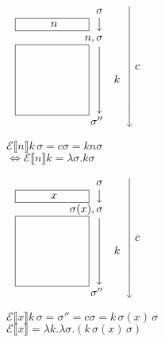 \documentclass[10pt,a4paper]{article}
\newcommand{\E}{\mathcal{E}}
\newcommand{\semm}[1]{\llbracket #1 \rrbracket }
\begin{document}
\begin{definition}[$\mathcal{E}\semm{a}$]
~~\\

$ \left.\begin{array}{r l}
     \sigma \\
 \left. \fbox{
 \begin{minipage}{2cm}
 \centering $n$
 \end{minipage}} \hspace{0.2cm} \right\downarrow  & \\
    n, \sigma\\
 \left.\fbox{ \begin{minipage}{2cm}
 \vspace{2cm} \quad
 \end{minipage}} \hspace{0.2cm} \right\downarrow& k \\
  \sigma''
\end{array}\right\downarrow c$\qquad
\begin{minipage}{200pt}
$\E\semm{n} k \, \sigma =  c \sigma = k n \sigma$\\
$\Leftrightarrow \E\semm{n} k = \lambda \sigma. k \sigma$
\end{minipage}
$ \left.\begin{array}{r l}
     \sigma \\
 \left. \fbox{
 \begin{minipage}{2cm}
 \centering $x$
 \end{minipage}} \hspace{0.2cm} \right\downarrow  & \\
    \sigma(x), \sigma\\
 \left.\fbox{ \begin{minipage}{2cm}
 \vspace{2cm} \quad
 \end{minipage}} \hspace{0.2cm} \right\downarrow& k \\
  \sigma''
\end{array}\right\downarrow c$\qquad
\begin{minipage}{200pt}
$\E\semm{x} k \, \sigma = \sigma'' = c \sigma = k \,\sigma(x)\, \sigma$\\
$\E\semm{x} = \lambda k. \lambda \sigma .(k \, \sigma(x) \, \sigma)$\\
\end{minipage}


\end{definition}
\end{document}
